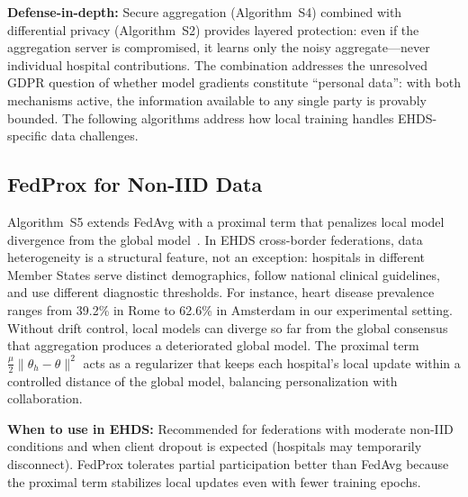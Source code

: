 \documentclass[conference,a4paper]{IEEEtran}
\begin{document}
\textbf{Defense-in-depth:} Secure aggregation (Algorithm~S4) combined with differential privacy (Algorithm~S2) provides layered protection: even if the aggregation server is compromised, it learns only the noisy aggregate---never individual hospital contributions. The combination addresses the unresolved GDPR question of whether model gradients constitute ``personal data'': with both mechanisms active, the information available to any single party is provably bounded. The following algorithms address how local training handles EHDS-specific data challenges.

\subsection{FedProx for Non-IID Data}

Algorithm~S5 extends FedAvg with a proximal term that penalizes local model divergence from the global model~\cite{li2020federated}. In EHDS cross-border federations, data heterogeneity is a structural feature, not an exception: hospitals in different Member States serve distinct demographics, follow national clinical guidelines, and use different diagnostic thresholds. For instance, heart disease prevalence ranges from 39.2\% in Rome to 62.6\% in Amsterdam in our experimental setting. Without drift control, local models can diverge so far from the global consensus that aggregation produces a deteriorated global model. The proximal term $\frac{\mu}{2}\|\theta_h - \theta\|^2$ acts as a regularizer that keeps each hospital's local update within a controlled distance of the global model, balancing personalization with collaboration.

\textbf{When to use in EHDS:} Recommended for federations with moderate non-IID conditions and when client dropout is expected (hospitals may temporarily disconnect). FedProx tolerates partial participation better than FedAvg because the proximal term stabilizes local updates even with fewer training epochs.
\end{document}
